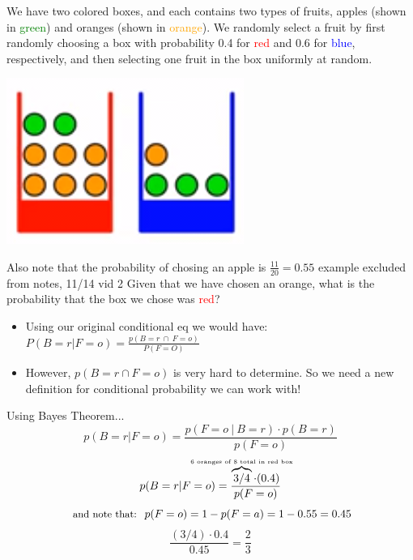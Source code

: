 \documentclass[12pt, letterpaper]{article}
\begin{document}
\begin{minipage}[t]{0.8\linewidth}
	We have two colored boxes, and each contains two types of fruits, apples (shown in \textcolor{green}{green}) and oranges (shown in \textcolor{orange}{orange}). We randomly select a fruit by first randomly choosing a box with probability 0.4 for \textcolor{red}{red} and 0.6 for \textcolor{blue}{blue}, respectively, and then
	selecting one fruit in the box uniformly at random. \\
	\end{minipage}
	\begin{minipage}[t]{0.15\linewidth}
		\strut\vspace*{-\baselineskip}\newline\hspace*{0.5cm}\includegraphics[width=\linewidth]{fruitboxes.png}
\end{minipage}

Also note that the probability of chosing an apple is $\frac{11}{20} = 0.55$ {\tiny example excluded from notes, 11/14 vid 2}
Given that we have chosen an orange, what is the probability that the box we chose was \textcolor{red}{red}?
\begin{itemize}[leftmargin=*, label={}]
	\item Using our original conditional eq we would have: $P(B = r | F = o) = \frac{p(B = r \ \cap \ F = o)}{P(F = O)}$
	\item However, $p(B = r \cap F = o)$ is very hard to determine. So we need a new definition for conditional probability we can work with!
\end{itemize}
Using Bayes Theorem...  \[p(B=r | F= o) = \frac{p(F = o \ | \ B = r) \cdot p(B = r)}{p(F=o)}  \] 
\[ p(B=r | F= o) = \frac{\overbrace{3/4}^{\makebox[0pt]{\tiny 6 oranges of 8 total in red box}} \cdot (0.4)}{p(F=o)} \]
\[\textnormal{\small \ and note that: \ } p(F = o) = 1 - p(F = a) = 1 - 0.55 = 0.45\]
\[\frac{(3/4) \cdot 0.4}{0.45} = \frac{2}{3}\]
\end{document}

